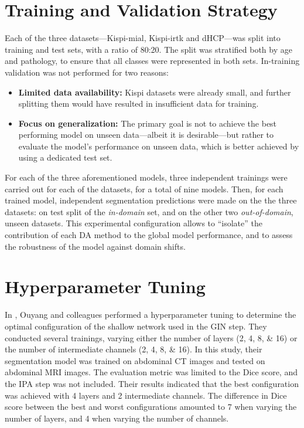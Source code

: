 \section{Training and Validation Strategy} \label{sec:TrainingAndValidationStrategy}
Each of the three datasets---Kispi-mial, Kispi-irtk and dHCP---was split into training and test sets, with a ratio of \num{80}:\num{20}. The split was stratified both by age and pathology, to ensure that all classes were represented in both sets. In-training validation was not performed for two reasons:
\begin{itemize}
    \item \textbf{Limited data availability:} Kispi datasets were already small, and further splitting them would have resulted in insufficient data for training.
    \item \textbf{Focus on generalization:} The primary goal is not to achieve the best performing model on unseen data---albeit it is desirable---but rather to evaluate the model's performance on unseen data, which is better achieved by using a dedicated test set.
\end{itemize}

For each of the three aforementioned models, three independent trainings were carried out for each of the datasets, for a total of nine models. Then, for each trained model, independent segmentation predictions were made on the the three datasets: on test split of the \textit{in-domain} set, and on the other two \textit{out-of-domain}, unseen datasets. This experimental configuration allows to \enquote{isolate} the contribution of each DA method to the global model performance, and to assess the robustness of the model against domain shifts.

\section{Hyperparameter Tuning} \label{sec:HyperparameterTuning}
In \cite{Ouyang2023}, Ouyang and colleagues performed a hyperparameter tuning to determine the optimal configuration of the shallow network used in the GIN step. They conducted several trainings, varying either the number of layers (\numlist[list-final-separator={ or }]{2;4;8;16}) or the number of intermediate channels (\numlist[list-final-separator={ or }]{2;4;8;16}). In this study, their segmentation model was trained on abdominal CT images and tested on abdominal MRI images. The evaluation metric was limited to the Dice score, and the IPA step was not included. Their results indicated that the best configuration was achieved with \num{4} layers and \num{2} intermediate channels. The difference in Dice score between the best and worst configurations amounted to \num{7} when varying the number of layers, and \num{4} when varying the number of channels.

